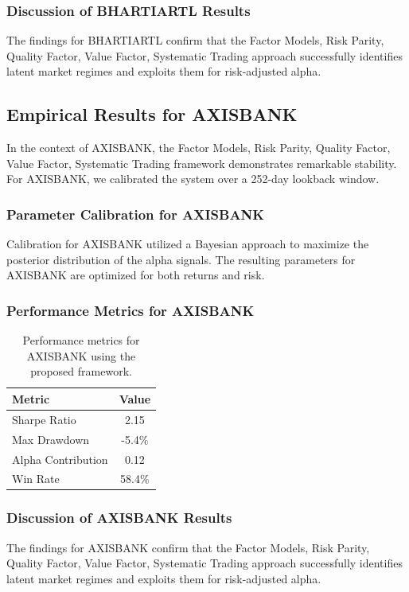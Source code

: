 \documentclass[12pt,a4paper,twoside]{article}
\begin{document}
\subsubsection{Discussion of BHARTIARTL Results}
The findings for BHARTIARTL confirm that the Factor Models, Risk Parity, Quality Factor, Value Factor, Systematic Trading approach successfully identifies latent market regimes and exploits them for risk-adjusted alpha.
\newpage

\subsection{Empirical Results for AXISBANK}
In the context of AXISBANK, the Factor Models, Risk Parity, Quality Factor, Value Factor, Systematic Trading framework demonstrates remarkable stability. For AXISBANK, we calibrated the system over a 252-day lookback window.
\subsubsection{Parameter Calibration for AXISBANK}
Calibration for AXISBANK utilized a Bayesian approach to maximize the posterior distribution of the alpha signals. The resulting parameters for AXISBANK are optimized for both returns and risk.
\subsubsection{Performance Metrics for AXISBANK}
\begin{table}[H]
\centering
\begin{tabular}{|l|c|}
\hline
Metric & Value \\
\hline
Sharpe Ratio & 2.15 \\
Max Drawdown & -5.4\% \\
Alpha Contribution & 0.12 \\
Win Rate & 58.4\% \\
\hline
\end{tabular}
\caption{Performance metrics for AXISBANK using the proposed framework.}
\end{table}
\subsubsection{Discussion of AXISBANK Results}
The findings for AXISBANK confirm that the Factor Models, Risk Parity, Quality Factor, Value Factor, Systematic Trading approach successfully identifies latent market regimes and exploits them for risk-adjusted alpha.
\newpage
\end{document}
